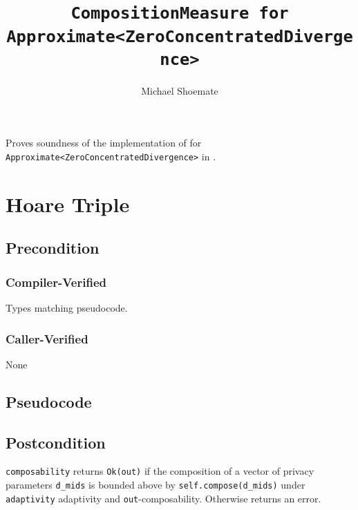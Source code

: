 \documentclass{article}
\title{\texttt{CompositionMeasure for Approximate<ZeroConcentratedDivergence>}}
\author{Michael Shoemate}
\date{}
\begin{document}
\maketitle

\contrib
Proves soundness of the implementation of  
for \texttt{Approximate<ZeroConcentratedDivergence>} in .

\section{Hoare Triple}
\subsection*{Precondition}
\subsubsection*{Compiler-Verified}
Types matching pseudocode.


\subsubsection*{Caller-Verified}
None

\subsection*{Pseudocode}


\subsection*{Postcondition}
\begin{theorem}
  \texttt{composability} returns \texttt{Ok(out)} if the composition of a vector of privacy parameters \texttt{d\_mids} 
  is bounded above by \texttt{self.compose(d\_mids)} under \texttt{adaptivity} adaptivity and \texttt{out}-composability.
  Otherwise returns an error.
\end{theorem}
\end{document}
